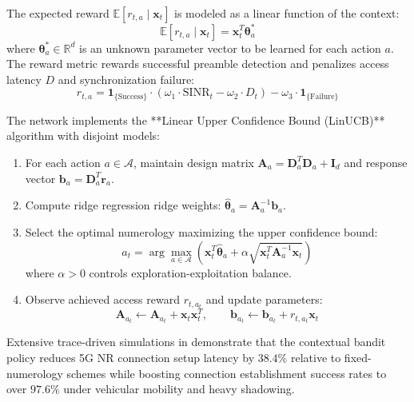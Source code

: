 The expected reward $\mathbb{E}[r_{t, a} \mid \mathbf{x}_t]$ is modeled as a linear function of the context:
\begin{equation}
    \mathbb{E}[r_{t, a} \mid \mathbf{x}_t] = \mathbf{x}_t^T \boldsymbol{\theta}_a^*
\end{equation}
where $\boldsymbol{\theta}_a^* \in \mathbb{R}^d$ is an unknown parameter vector to be learned for each action $a$. The reward metric rewards successful preamble detection and penalizes access latency $D$ and synchronization failure:
\begin{equation}
    r_{t, a} = \mathbf{1}_{\{\text{Success}\}} \cdot \left( \omega_1 \cdot \mathrm{SINR}_t - \omega_2 \cdot D_t \right) - \omega_3 \cdot \mathbf{1}_{\{\text{Failure}\}}
\end{equation}

The network implements the **Linear Upper Confidence Bound (LinUCB)** algorithm with disjoint models:
\begin{enumerate}
    \item For each action $a \in \mathcal{A}$, maintain design matrix $\mathbf{A}_a = \mathbf{D}_a^T \mathbf{D}_a + \mathbf{I}_d$ and response vector $\mathbf{b}_a = \mathbf{D}_a^T \mathbf{r}_a$.
    \item Compute ridge regression ridge weights: $\hat{\boldsymbol{\theta}}_a = \mathbf{A}_a^{-1} \mathbf{b}_a$.
    \item Select the optimal numerology maximizing the upper confidence bound:
    \begin{equation}
        a_t = \arg\max_{a \in \mathcal{A}} \left( \mathbf{x}_t^T \hat{\boldsymbol{\theta}}_a + \alpha \sqrt{ \mathbf{x}_t^T \mathbf{A}_a^{-1} \mathbf{x}_t } \right)
    \end{equation}
    where $\alpha > 0$ controls exploration-exploitation balance.
    \item Observe achieved access reward $r_{t, a_t}$ and update parameters:
    \begin{equation}
        \mathbf{A}_{a_t} \leftarrow \mathbf{A}_{a_t} + \mathbf{x}_t \mathbf{x}_t^T, \qquad \mathbf{b}_{a_t} \leftarrow \mathbf{b}_{a_t} + r_{t, a_t} \mathbf{x}_t
    \end{equation}
\end{enumerate}

Extensive trace-driven simulations in \cite{bommisetty2024contextual} demonstrate that the contextual bandit policy reduces 5G NR connection setup latency by $38.4\%$ relative to fixed-numerology schemes while boosting connection establishment success rates to over $97.6\%$ under vehicular mobility and heavy shadowing.

